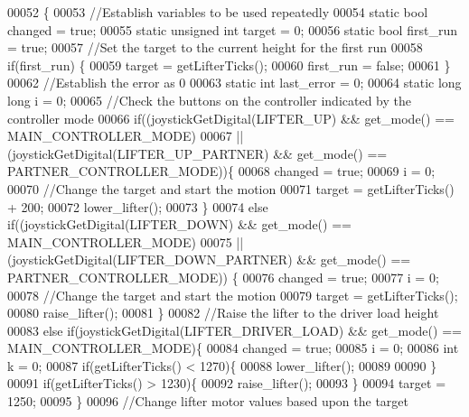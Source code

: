 \begin{DoxyCode}
00052                      \{
00053   \textcolor{comment}{//Establish variables to be used repeatedly}
00054   \textcolor{keyword}{static} \textcolor{keywordtype}{bool} changed = \textcolor{keyword}{true};
00055   \textcolor{keyword}{static} \textcolor{keywordtype}{unsigned} \textcolor{keywordtype}{int} target = 0;
00056   \textcolor{keyword}{static} \textcolor{keywordtype}{bool} first\_run = \textcolor{keyword}{true};
00057   \textcolor{comment}{//Set the target to the current height for the first run}
00058   \textcolor{keywordflow}{if}(first\_run) \{
00059     target = getLifterTicks();
00060     first\_run = \textcolor{keyword}{false};
00061   \}
00062   \textcolor{comment}{//Establish the error as 0}
00063   \textcolor{keyword}{static} \textcolor{keywordtype}{int} last\_error = 0;
00064   \textcolor{keyword}{static} \textcolor{keywordtype}{long} \textcolor{keywordtype}{long} i = 0;
00065   \textcolor{comment}{//Check the buttons on the controller indicated by the controller mode}
00066   \textcolor{keywordflow}{if}((joystickGetDigital(LIFTER_UP) && get_mode() == MAIN_CONTROLLER_MODE)
00067    || (joystickGetDigital(LIFTER_UP_PARTNER) && get_mode() == 
      PARTNER_CONTROLLER_MODE))\{
00068     changed = \textcolor{keyword}{true};
00069     i = 0;
00070     \textcolor{comment}{//Change the target and start the motion}
00071     target = getLifterTicks() + 200;
00072     lower_lifter();
00073   \}
00074   \textcolor{keywordflow}{else} \textcolor{keywordflow}{if}((joystickGetDigital(LIFTER_DOWN) && get_mode() == MAIN_CONTROLLER_MODE)
00075    || (joystickGetDigital(LIFTER_DOWN_PARTNER) && get_mode() == 
      PARTNER_CONTROLLER_MODE)) \{
00076     changed = \textcolor{keyword}{true};
00077     i = 0;
00078     \textcolor{comment}{//Change the target and start the motion}
00079     target = getLifterTicks();
00080     raise_lifter();
00081   \}
00082   \textcolor{comment}{//Raise the lifter to the driver load height}
00083   \textcolor{keywordflow}{else} \textcolor{keywordflow}{if}(joystickGetDigital(LIFTER_DRIVER_LOAD) && get_mode() == 
      MAIN_CONTROLLER_MODE)\{
00084     changed = \textcolor{keyword}{true};
00085     i = 0;
00086     \textcolor{keywordtype}{int} k = 0;
00087     \textcolor{keywordflow}{if}(getLifterTicks() < 1270)\{
00088       lower_lifter();
00089 
00090     \}
00091     \textcolor{keywordflow}{if}(getLifterTicks() > 1230)\{
00092       raise_lifter();
00093     \}
00094     target = 1250;
00095   \}
00096   \textcolor{comment}{//Change lifter motor values based upon the target}

\end{DoxyCode}
